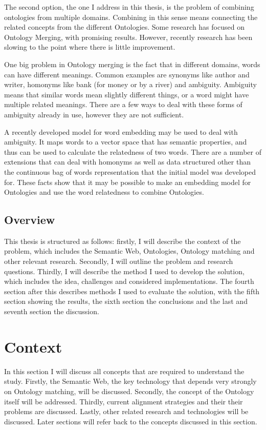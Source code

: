 \documentclass{article}
\begin{document}
 The second option, the one I address in this thesis, is the problem of combining ontologies from multiple domains. Combining in this sense means connecting the related concepts from the different Ontologies. Some research has focused on Ontology Merging, with promising results. However, recently research has been slowing to the point where there is little improvement.
 
 One big problem in Ontology merging is the fact that in different domains, words can have different meanings. Common examples are synonyms like author and writer, homonyms like bank (for money or by a river) and ambiguity. Ambiguity means that similar words mean slightly different things, or a word might have multiple related meanings. There are a few ways to deal with these forms of ambiguity already in use, however they are not sufficient.
 
 A recently developed model for word embedding may be used to deal with ambiguity. It maps words to a vector space that has semantic properties, and thus can be used to calculate the relatedness of two words. There are a number of extensions that can deal with homonyms as well as data structured other than the continuous bag of words representation that the initial model was developed for. These facts show that it may be possible to make an embedding model for Ontologies and use the word relatedness to combine Ontologies.
 
 \subsection{Overview}
 This thesis is structured as follows: firstly, I will describe the context of the problem, which includes the Semantic Web, Ontologies, Ontology matching and other relevant research. Secondly, I will outline the problem and research questions. Thirdly, I will describe the method I used to develop the solution, which includes the idea, challenges and considered implementations. The fourth section after this describes methods I used to evaluate the solution, with the fifth section showing the results, the sixth section the conclusions and the last and seventh section the discussion.
 
\newpage
\section{Context}
 In this section I will discuss all concepts that are required to understand the study. Firstly, the Semantic Web, the key technology that depends very strongly on Ontology matching, will be discussed. Secondly, the concept of the Ontology itself will be addressed. Thirdly, current alignment strategies and their their problems are discussed. Lastly, other related research and technologies will be discussed. Later sections will refer back to the concepts discussed in this section.
\end{document}
